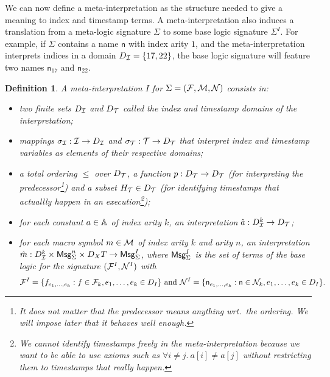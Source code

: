 \documentclass[a4paper]{article}
\newtheorem{definition}{Definition}
\theoremstyle{remark}
\begin{document}
We can now define a meta-interpretation as the structure needed to
give a meaning to index and timestamp terms. A meta-interpretation
also induces a translation from a meta-logic signature $\Sigma$
to some base logic signature $\Sigma^I$. For example, if
$\Sigma$ contains a name $\mathsf{n}$ with index arity $1$, and
the meta-interpretation interprets indices in a domain $D_{\mathcal{I}} = \{
  17, 22 \}$, the base logic signature will feature
two names $\mathsf{n}_{17}$ and $\mathsf{n}_{22}$.

\begin{definition}
  A meta-interpretation $I$ for $\Sigma = (\mathcal{F},\mathcal{M},\mathcal{N})$ consists in:
  \begin{itemize}
    \item two finite sets $D_{\mathcal{I}}$ and $D_{\mathcal{T}}$ called the index and timestamp
      domains of the interpretation;
    \item mappings $\sigma_{\mathcal{I}} : \mathcal{I} \to D_{\mathcal{I}}$
      and $\sigma_{\mathcal{T}} : \mathcal{T} \to D_{\mathcal{T}}$ that interpret index and
      timestamp variables as elements of their respective domains;
    \item a total ordering $\leq$ over $D_{\mathcal{T}}$,
      a function $p : D_{\mathcal{T}} \to D_{\mathcal{T}}$ (for interpreting the 
      predecessor\footnote{
        It does not matter that the predecessor means anything
        wrt.\ the ordering. We will impose later that it behaves
        well enough.
      })
      and a subset $H_{\mathcal{T}}\in D_{\mathcal{T}}$ (for identifying timestamps
      that actuallly happen in an execution\footnote{
        We cannot identify timestamps freely in the meta-interpretation
        because we want to be able to use axioms such as
        $\forall i\neq j.~ a[i] \neq a[j]$ without restricting
        them to timestamps that really happen.
      });
    \item for each constant $a \in \mathbb{A}$ of index arity $k$,
      an interpretation $\hat{a} : D_{\mathcal{I}}^k \to D_{\mathcal{T}}$;
    \item for each macro symbol $m \in \mathcal{M}$ of index
      arity $k$ and arity $n$, an interpretation
      $\hat{m} : D_{\mathcal{I}}^k \times \mathsf{Msg}_\Sigma^n \times D_XT \to \mathsf{Msg}^I_\Sigma$,
      where $\mathsf{Msg}^I_\Sigma$ is the set of terms of the base
      logic for the signature
      $(\mathcal{F}^I,\mathcal{N}^I)$ with
      $$ \mathcal{F}^I =
      \{ f_{e_1,\ldots,e_k} : f \in \mathcal{F}_k, e_1,\ldots,e_k \in D_I \}
      \text{ and }
      \mathcal{N}^I = \{ \mathsf{n}_{e_1,\ldots,e_k} : \mathsf{n}\in\mathcal{N}_k, 
      e_1,\ldots,e_k\in D_I \}.$$
  \end{itemize}
\end{definition}
\end{document}
